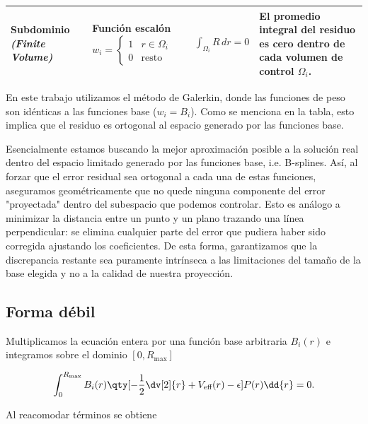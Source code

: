 \begin{table}[htbp]
\begin{tabularx}{\textwidth}{ 
        >{\RaggedRight\bfseries}m{2.5cm}  
        >{\RaggedRight}m{3.5cm}           
        >{\centering}m{3.5cm}             
        >{\RaggedRight\arraybackslash}X   
    }
        Subdominio \newline \textit{\footnotesize (Finite \newline Volume)} & 
        Función escalón \newline $w_i = \begin{cases} 1 & r \in \Omega_i \\ 0 & \text{resto} \end{cases}$ & 
        $\displaystyle \int_{\Omega_i} R \, dr = 0$ & 
        El \textbf{promedio integral} del residuo es cero dentro de cada volumen de control $\Omega_i$. \\
        \bottomrule
    \end{tabularx}
\end{table}

En este trabajo utilizamos el método de Galerkin, donde las funciones de peso son idénticas a las funciones base (\( w_i = B_i \)). Como se menciona en la tabla, esto implica que el residuo es ortogonal al espacio generado por las funciones base.

Esencialmente estamos buscando la mejor aproximación posible a la solución real dentro del espacio limitado generado por las funciones base, i.e. B-splines. Así, al forzar que el error residual sea ortogonal a cada una de estas funciones, aseguramos geométricamente que no quede ninguna componente del error "proyectada" dentro del subespacio que podemos controlar. Esto es análogo a minimizar la distancia entre un punto y un plano trazando una línea perpendicular: se elimina cualquier parte del error que pudiera haber sido corregida ajustando los coeficientes. De esta forma, garantizamos que la discrepancia restante sea puramente intrínseca a las limitaciones del tamaño de la base elegida y no a la calidad de nuestra proyección.

\subsection{Forma débil}

Multiplicamos la ecuación entera por una función base arbitraria \( B_i(r) \) e integramos sobre el dominio \( [0,R_{\text{max}}] \)

\begin{equation}
\label{eq:mwr1}
  \int_{0}^{R_{\text{max}}} B_i(r) \qty[ -\frac{1}{2}\dv[2]{r} + V_{\text{eff}}(r) - \epsilon ] P(r) \dd{r} = 0.
\end{equation}

Al reacomodar términos se obtiene

